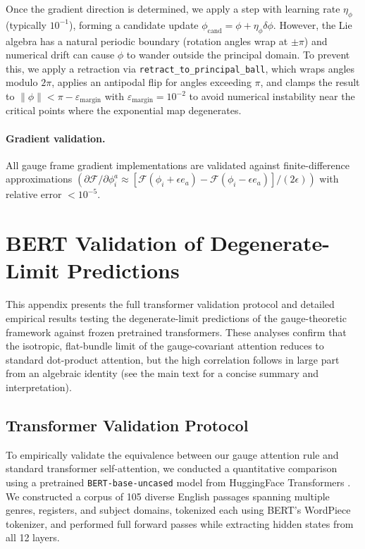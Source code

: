 \documentclass[twoside,11pt]{article}
\begin{document}
Once the gradient direction is determined, we apply a step with learning rate $\eta_\phi$ (typically $10^{-1}$), forming a candidate update $\phi_{\text{cand}} = \phi + \eta_\phi \delta \phi$. However, the Lie algebra has a natural periodic boundary (rotation angles wrap at $\pm \pi$) and numerical drift can cause $\phi$ to wander outside the principal domain. To prevent this, we apply a retraction via \texttt{retract\_to\_principal\_ball}, which wraps angles modulo $2\pi$, applies an antipodal flip for angles exceeding $\pi$, and clamps the result to $\|\phi\| < \pi - \varepsilon_{\mathrm{margin}}$ with $\varepsilon_{\mathrm{margin}} = 10^{-2}$ to avoid numerical instability near the critical points where the exponential map degenerates.


\paragraph{Gradient validation.} All gauge frame gradient implementations are validated against finite-difference approximations $(\partial \mathcal{F}/\partial \phi_i^a \approx [\mathcal{F}(\phi_i + \epsilon e_a) - \mathcal{F}(\phi_i - \epsilon e_a)]/(2\epsilon))$ with relative error $< 10^{-5}$.


\section{BERT Validation of Degenerate-Limit Predictions}
\label{app:bert_validation}

This appendix presents the full transformer validation protocol and detailed empirical results testing the degenerate-limit predictions of the gauge-theoretic framework against frozen pretrained transformers. These analyses confirm that the isotropic, flat-bundle limit of the gauge-covariant attention reduces to standard dot-product attention, but the high correlation follows in large part from an algebraic identity (see the main text for a concise summary and interpretation).

\subsection{Transformer Validation Protocol}
To empirically validate the equivalence between our gauge attention rule and standard transformer self-attention, we conducted a quantitative comparison using a pretrained \texttt{BERT-base-uncased} model from HuggingFace Transformers \citep{devlin2018bert}. We constructed a corpus of 105 diverse English passages spanning multiple genres, registers, and subject domains, tokenized each using BERT's WordPiece tokenizer, and performed full forward passes while extracting hidden states from all 12 layers.
\end{document}
